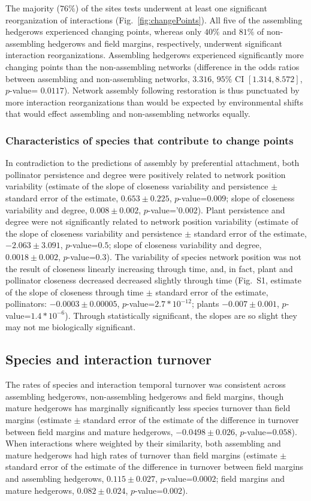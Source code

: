 \documentclass[12pt]{article}
\begin{document}
The majority ($76\%$) of the sites tests underwent at least one
significant reorganization of interactions
(Fig.~\ref{fig:changePoints}).  All five of the assembling hedgerows
experienced changing points, whereas only $40\%$ and $81\%$ of
non-assembling hedgerows and field margins, respectively, underwent
significant interaction reorganizations. Assembling hedgerows
experienced significantly more changing points than the non-assembling
networks (difference in the odds ratios between assembling and
non-assembling networks, $3.316$, $95\%$ CI $[1.314, 8.572]$,
$p$-value= $0.0117$). Network assembly following restoration is thus
punctuated by more interaction reorganizations than would be expected
by environmental shifts that would effect assembling and
non-assembling networks equally.

\subsubsection*{Characteristics of species that contribute to change
  points}

In contradiction to the predictions of assembly by preferential
attachment, both pollinator persistence and degree were positively
related to network position variability (estimate of the slope of
closeness variability and persistence $\pm$ standard error of the
estimate, $0.653 \pm 0.225$, $p$-value=$0.009$; slope of closeness
variability and degree, $0.008 \pm 0.002$, $p$-value='$0.002$). Plant
persistence and degree were not significantly related to network
position variability (estimate of the slope of closeness variability
and persistence $\pm$ standard error of the estimate, $-2.063 \pm
3.091$, $p$-value=$0.5$; slope of closeness variability and degree,
$0.0018 \pm 0.002$, $p$-value=$0.3$). The variability of species
network position was not the result of closeness linearly increasing
through time, and, in fact, plant and pollinator closeness decreased
decreased slightly through time (Fig.~S1, estimate of the slope of
closeness through time $\pm$ standard error of the estimate,
pollinators: $-0.0003 \pm 0.00005$, $p$-value=$2.7*10^{-12}$; plants
$-0.007 \pm 0.001$, $p$-value=$1.4*10^{-6}$). Through statistically
significant, the slopes are so slight they may not me biologically
significant.

\subsection*{Species and interaction turnover}
The rates of species and interaction temporal turnover was consistent
across assembling hedgerows, non-assembling hedgerows and field
margins, though mature hedgerows has marginally significantly less
species turnover than field margins (estimate $\pm$ standard error of
the estimate of the difference in turnover between field margins and
mature hedgerows, $-0.0498 \pm 0.026$, $p$-value=$0.058$). When
interactions where weighted by their similarity, both assembling and
mature hedgerows had high rates of turnover than field margins
(estimate $\pm$ standard error of the estimate of the difference in
turnover between field margins and assembling hedgerows, $0.115 \pm
0.027$, $p$-value=$0.0002$; field margins and mature hedgerows, $0.082
\pm 0.024$, $p$-value=$0.002$).
\end{document}

